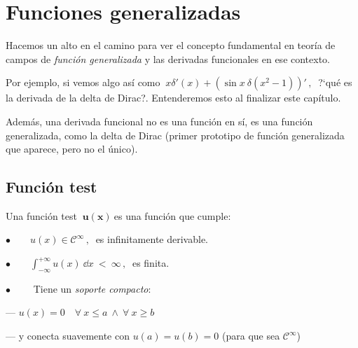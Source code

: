 \chapter{Funciones generalizadas}


\vspace{10mm}
\begin{adjustwidth}{50pt}{50pt}
\begin{ejemplo}
\vspace{2mm}

Hacemos un alto en el camino para ver el concepto fundamental en teoría de campos de \emph{función generalizada} y las derivadas funcionales en ese contexto.

Por ejemplo, si vemos algo así como $\ x\delta'(x)+(\sin x \ \delta(x^2-1) )'\, , \ $ ?`qué es la derivada de la delta de Dirac?. Entenderemos esto al finalizar este capítulo.

Además, una derivada funcional no es una función en sí, es una función generalizada, como la delta de Dirac (primer prototipo de función generalizada que aparece, pero no el único).
\vspace{2mm}

\end{ejemplo}
\end{adjustwidth}

\vspace{5mm}

\section{Función test}

\begin{definition}

Una función test $\  \boldsymbol{ u(x) } \ $es una función que cumple:	

\vspace{2mm} \hspace{1cm} $\bullet \qquad u(x) \in \mathcal C^\infty \, , \ $  es infinitamente derivable.

\vspace{2mm} \hspace{1cm} $\bullet \qquad \displaystyle \int_{-\infty}^{+\infty} u(x)\ \dd x \ < \ \infty\, , \ $ es finita.

\vspace{2mm} \hspace{1cm} $\bullet \qquad$ Tiene un \emph{soporte compacto}:

\vspace{2mm}\hspace{3cm} --- $u(x)=0 \quad \forall \ x \le a \ \wedge \ \forall \ x \ge b\ $ 

\vspace{2mm}\hspace{3cm} --- y conecta suavemente con $u(a)=u(b)=0$ (para que sea $ \mathcal C^\infty $)
\end{definition}


